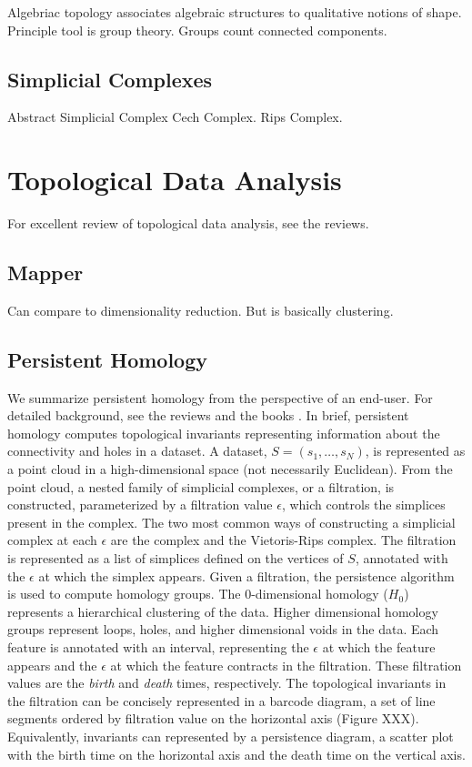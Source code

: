Algebriac topology associates algebraic structures to qualitative notions of shape.
Principle tool is group theory.
Groups count connected components.

\subsection{Simplicial Complexes}

Abstract Simplicial Complex
Cech Complex.
Rips Complex.

\section{Topological Data Analysis}

For excellent review of topological data analysis, see the reviews.

\subsection{Mapper}

Can compare to dimensionality reduction.
But is basically clustering.

\subsection{Persistent Homology}
\label{subsec:persistent_homology}

We summarize persistent homology from the perspective of an end-user.
For detailed background, see the reviews \cite{Carlsson:2009a,Ghrist:2008} and the books \cite{Edelsbrunner:2010,Zomorodian:2005b}.
In brief, persistent homology computes topological invariants representing information about the connectivity and holes in a dataset.
A dataset, $S=(s_{1},\ldots,s_{N})$, is represented as a point cloud in a high-dimensional space (not necessarily Euclidean).
From the point cloud, a nested family of simplicial complexes, or a filtration, is constructed, parameterized by a filtration value $\epsilon$, which controls the simplices present in the complex.
The two most common ways of constructing a simplicial complex at each $\epsilon$ are the \Cech complex and the Vietoris-Rips complex.
The filtration is represented as a list of simplices defined on the vertices of $S$, annotated with the $\epsilon$ at which the simplex appears.
Given a filtration, the persistence algorithm is used to compute homology groups.
The $0$-dimensional homology ($H_0$) represents a hierarchical clustering of the data.
Higher dimensional homology groups represent loops, holes, and higher dimensional voids in the data.
Each feature is annotated with an interval, representing the $\epsilon$ at which the feature appears and the $\epsilon$ at which the feature contracts in the filtration.
These filtration values are the \emph{birth} and \emph{death} times, respectively.
The topological invariants in the filtration can be concisely represented in a barcode diagram, a set of line segments ordered by filtration value on the horizontal axis (Figure XXX).
Equivalently, invariants can represented by a persistence diagram, a scatter plot with the birth time on the horizontal axis and the death time on the vertical axis.

